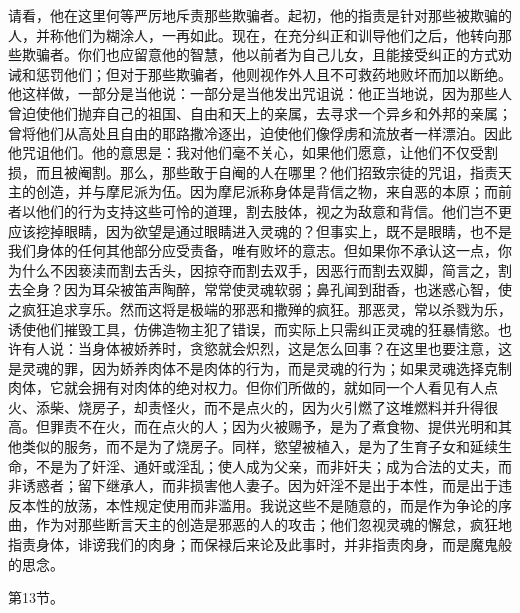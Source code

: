 请看，他在这里何等严厉地斥责那些欺骗者。起初，他的指责是针对那些被欺骗的人，并称他们为糊涂人，一再如此。现在，在充分纠正和训导他们之后，他转向那些欺骗者。你们也应留意他的智慧，他以前者为自己儿女，且能接受纠正的方式劝诫和惩罚他们；但对于那些欺骗者，他则视作外人且不可救药地败坏而加以断绝。他这样做，一部分是当他说：一部分是当他发出咒诅说：他正当地说，因为那些人曾迫使他们抛弃自己的祖国、自由和天上的亲属，去寻求一个异乡和外邦的亲属；曾将他们从高处且自由的耶路撒冷逐出，迫使他们像俘虏和流放者一样漂泊。因此他咒诅他们。他的意思是：我对他们毫不关心，如果他们愿意，让他们不仅受割损，而且被阉割。那么，那些敢于自阉的人在哪里？他们招致宗徒的咒诅，指责天主的创造，并与摩尼派为伍。因为摩尼派称身体是背信之物，来自恶的本原；而前者以他们的行为支持这些可怜的道理，割去肢体，视之为敌意和背信。他们岂不更应该挖掉眼睛，因为欲望是通过眼睛进入灵魂的？但事实上，既不是眼睛，也不是我们身体的任何其他部分应受责备，唯有败坏的意志。但如果你不承认这一点，你为什么不因亵渎而割去舌头，因掠夺而割去双手，因恶行而割去双脚，简言之，割去全身？因为耳朵被笛声陶醉，常常使灵魂软弱；鼻孔闻到甜香，也迷惑心智，使之疯狂追求享乐。然而这将是极端的邪恶和撒殚的疯狂。那恶灵，常以杀戮为乐，诱使他们摧毁工具，仿佛造物主犯了错误，而实际上只需纠正灵魂的狂暴情慾。也许有人说：当身体被娇养时，贪慾就会炽烈，这是怎么回事？在这里也要注意，这是灵魂的罪，因为娇养肉体不是肉体的行为，而是灵魂的行为；如果灵魂选择克制肉体，它就会拥有对肉体的绝对权力。但你们所做的，就如同一个人看见有人点火、添柴、烧房子，却责怪火，而不是点火的，因为火引燃了这堆燃料并升得很高。但罪责不在火，而在点火的人；因为火被赐予，是为了煮食物、提供光明和其他类似的服务，而不是为了烧房子。同样，慾望被植入，是为了生育子女和延续生命，不是为了奸淫、通奸或淫乱；使人成为父亲，而非奸夫；成为合法的丈夫，而非诱惑者；留下继承人，而非损害他人妻子。因为奸淫不是出于本性，而是出于违反本性的放荡，本性规定使用而非滥用。我说这些不是随意的，而是作为争论的序曲，作为对那些断言天主的创造是邪恶的人的攻击；他们忽视灵魂的懈怠，疯狂地指责身体，诽谤我们的肉身；而保禄后来论及此事时，并非指责肉身，而是魔鬼般的思念。\par

第13节。\par

